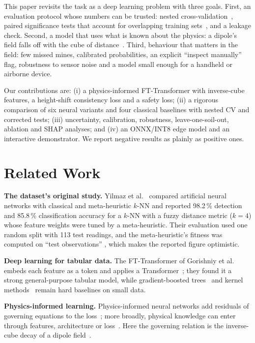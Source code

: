 \documentclass[conference]{IEEEtran}
\begin{document}
This paper revisits the task as a deep learning problem with three goals. First, an evaluation protocol whose numbers can be trusted: nested cross-validation~\cite{varma2006}, paired significance tests that account for overlapping training sets~\cite{nadeau2003,bouckaert2004}, and a leakage check. Second, a model that uses what is known about the physics: a dipole's field falls off with the cube of distance~\cite{jackson1999}. Third, behaviour that matters in the field: few missed mines, calibrated probabilities, an explicit ``inspect manually'' flag, robustness to sensor noise and a model small enough for a handheld or airborne device.

Our contributions are: (i) a physics-informed FT-Transformer with inverse-cube features, a height-shift consistency loss and a safety loss; (ii) a rigorous comparison of six neural variants and four classical baselines with nested CV and corrected tests; (iii) uncertainty, calibration, robustness, leave-one-soil-out, ablation and SHAP analyses; and (iv) an ONNX/INT8 edge model and an interactive demonstrator. We report negative results as plainly as positive ones.

\section{Related Work}
\textbf{The dataset's original study.} Yilmaz et al.~\cite{yilmaz2018} compared artificial neural networks with classical and meta-heuristic $k$-NN and reported 98.2\,\% detection and 85.8\,\% classification accuracy for a $k$-NN with a fuzzy distance metric ($k=4$) whose feature weights were tuned by a meta-heuristic. Their evaluation used one random split with 113 test readings, and the meta-heuristic's fitness was computed on ``test observations'' \cite[p.~47877]{yilmaz2018}, which makes the reported figure optimistic.

\textbf{Deep learning for tabular data.} The FT-Transformer of Gorishniy et al.~\cite{gorishniy2021} embeds each feature as a token and applies a Transformer~\cite{vaswani2017}; they found it a strong general-purpose tabular model, while gradient-boosted trees~\cite{chen2016} and kernel methods~\cite{cortes1995} remain hard baselines on small data.

\textbf{Physics-informed learning.} Physics-informed neural networks add residuals of governing equations to the loss~\cite{raissi2019}; more broadly, physical knowledge can enter through features, architecture or loss~\cite{karniadakis2021}. Here the governing relation is the inverse-cube decay of a dipole field~\cite{jackson1999}.
\end{document}
